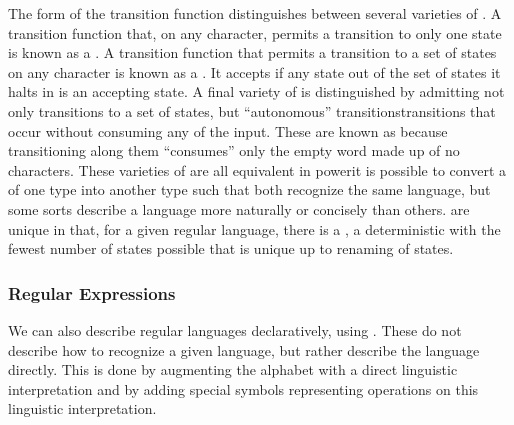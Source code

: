 The form of the transition function distinguishes between several varieties of \FAs. A transition function that, on any character, permits a transition to only one state is known as a . A transition function that permits a transition to a set of states on any character is known as a . It accepts if any state out of the set of states it halts in is an accepting state. A final variety of \FA is distinguished by admitting not only transitions to a set of states, but ``autonomous'' transitions\empause transitions that occur without consuming any of the input. These are known as  because transitioning along them ``consumes'' only the empty word \emptyword made up of no characters. These varieties of \FAs are all equivalent in power\empause it is possible to convert a \FA of one type into another type such that both recognize the same language\empause , but some sorts describe a language more naturally or concisely than others. \FAs are unique in that, for a given regular language, there is a , a deterministic \FA with the fewest number of states possible that is unique up to renaming of states.

\subsubsection{Regular Expressions}
We can also describe regular languages declaratively, using . These do not describe how to recognize a given language, but rather describe the language directly. This is done by augmenting the alphabet with a direct linguistic interpretation and by adding special symbols representing operations on this linguistic interpretation. 

